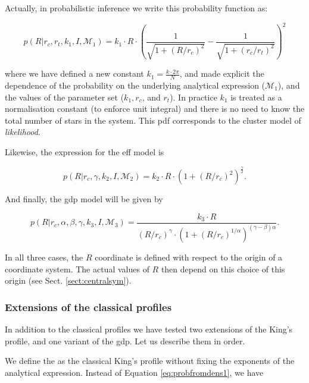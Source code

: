 Actually, in probabilistic inference we write this probability
function as:

\begin{equation}
  p(R|r_c, r_t, k_1,I,\mathcal{M}_1)=k_1\cdot R \cdot
  \left(\frac{1}{\sqrt{1+(R/r_c)^2}} - \frac{1}{\sqrt{1+(r_c/r_t)^2}}\right)^2
\label{eq:probfromdens1}
\end{equation}

where we have defined a new constant $k_1=\frac{k\cdot2\pi}{N}$, and made explicit the dependence of the probability on the underlying analytical expression ($\mathcal{M}_1$), and the values of the parameter set ($k_1, r_c$, and $r_t$). In practice $k_1$ is treated as a normalisation constant (to enforce unit integral) and there is no need to know the total number of stars in the system. This \gls{pdf} corresponds to the cluster model of \emph{likelihood}.

Likewise, the expression for the \gls{eff} model is

\begin{equation}
  p(R|r_c, \gamma, k_2,I,\mathcal{M}_2)=k_2\cdot R \cdot
  (1+(R/r_c)^2)^\frac{\gamma}{2}.
\label{eq:probfromdens2}
\end{equation}

And finally, the \gls{gdp} model will be given by

\begin{equation}
  p(R| r_c,\alpha, \beta, \gamma, k_3,I,\mathcal{M}_3 ) = \frac
  {k_3\cdot R} {
    (R/r_c)^{\gamma}\cdot(1+(R/r_c)^{1/\alpha})^{(\gamma-\beta)\alpha}}.
  \label{eq:probfromdens3}
\end{equation}

In all three cases, the $R$ coordinate is defined with respect to the
origin of a coordinate system. The actual values of $R$ then depend on
this choice of this  origin (see Sect. \ref{sect:centralsym}). 


\subsubsection{Extensions of the classical profiles}

In addition to the classical profiles we have tested two extensions of
the King's profile, and one variant of the \gls{gdp}. Let us
describe them in order.

We define the  as the
classical King's profile without fixing the exponents of the analytical
expression. Instead of Equation \ref{eq:probfromdens1}, we have

